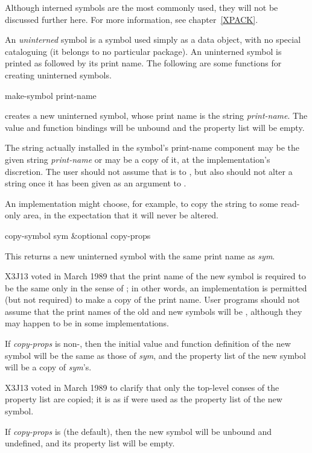 Although interned symbols are the most commonly
used, they will not be discussed further here.  For more information,
see chapter~\ref{XPACK}.

An \emph{uninterned} symbol is a symbol used simply as a data object,
with no special cataloguing (it belongs to no particular package).
An uninterned symbol is printed as \cd{\#:} followed by its
print name.
The following are some functions for creating uninterned symbols.

\begin{defun}[Function]
make-symbol print-name

 creates a new uninterned symbol, whose
print name is the string \emph{print-name}.  The value and function bindings will
be unbound and the property list will be empty.

The string actually installed in the symbol's print-name component
may be the given string \emph{print-name} or may be a copy of it,
at the implementation's discretion.  The user should not assume
that  is  to , but also
should not alter a string once it has been given as an argument
to .

\beforenoterule
\begin{implementation}
An implementation might choose, for example,
to copy the string to some read-only area, in the expectation that
it will never be altered.
\end{implementation}
\afternoterule
\end{defun}

\begin{defun}[Function]
copy-symbol sym &optional copy-props

This returns a new uninterned symbol with the same print name
as \emph{sym}.

\begin{newer}
X3J13 voted in March 1989 
that the print name of the new symbol is required to be
the same only in the sense of ; in other words,
an implementation is permitted (but not required)
to make a copy of the print name.
User programs should not assume that the print names of the old and new symbols
will be , although they may happen to be  in some implementations.
\end{newer}

If \emph{copy-props} is non-{\nil}, then the initial
value and function definition of the new symbol will
be the same as those of \emph{sym}, and the property list of
the new symbol will be a copy of \emph{sym}'s.

\begin{newer}
X3J13 voted in March 1989 
to clarify that only the top-level conses of the
property list are copied; it is as if 
were used as the property list of the new symbol.
\end{newer}

If \emph{copy-props}
is {\nil} (the default), then the new symbol will be unbound and undefined, and
its property list will be empty.
\end{defun}

